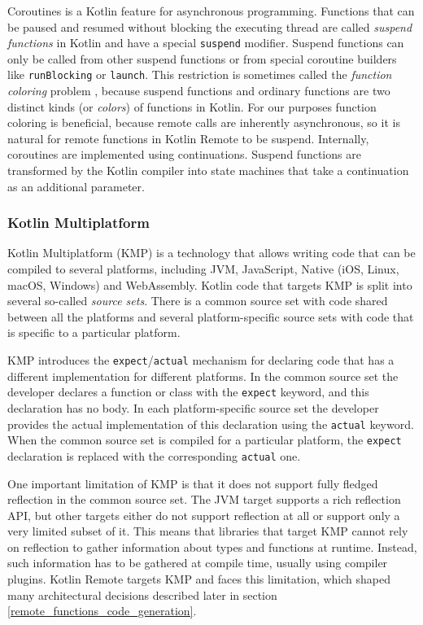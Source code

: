 \documentclass[a4paper,11pt,oneside]{article}
\newcommand{\term}[1]{\textit{#1}}
\newcommand{\kotlini}[1]{\texttt{#1}}
\begin{document}
Coroutines \cite{noauthor_kotlin_coroutines_nodate} is a Kotlin feature for asynchronous
programming. Functions that can be paused and resumed without blocking the executing thread are
called \term{suspend functions} in Kotlin and have a special \kotlini{suspend} modifier. Suspend
functions can only be called from other suspend functions or from special coroutine builders like
\kotlini{runBlocking} or \kotlini{launch}. This restriction is sometimes called the \term{function
coloring} problem \cite{noauthor_what_nodate}\cite{noauthor_keepnotescode-coloringmd_nodate},
because suspend functions and ordinary functions are two distinct kinds (or
\term{colors}) of functions in Kotlin. For our purposes function coloring is beneficial,
because remote calls are inherently asynchronous, so it is natural for remote functions in Kotlin
Remote to be suspend. Internally, coroutines are implemented using continuations. Suspend functions are transformed by the
Kotlin compiler into state machines that take a continuation as an additional parameter.

\subsubsection{Kotlin Multiplatform} \label{kotlin-multiplatform-section}

Kotlin Multiplatform (KMP) \cite{noauthor_kotlin_multiplatform_nodate} is a technology that allows
writing code that can be compiled to several platforms, including JVM, JavaScript, Native (iOS,
Linux, macOS, Windows) and WebAssembly. Kotlin code that targets KMP is split into several
so-called \term{source sets}. There is a common source set with code shared between all the
platforms and several platform-specific source sets with code that is specific to a particular
platform.

KMP introduces the \kotlini{expect}/\kotlini{actual} mechanism for declaring code that has a different
implementation for different platforms. In the common source set the developer declares a function or class
with the \kotlini{expect} keyword, and this declaration has no body. In each platform-specific source set
the developer provides the actual implementation of this declaration using the \kotlini{actual} keyword. When
the common source set is compiled for a particular platform, the \kotlini{expect} declaration is replaced
with the corresponding \kotlini{actual} one.

One important limitation of KMP is that it does not support fully fledged reflection in the common
source set. The JVM target supports a rich reflection API, but other targets either do not support
reflection at all or support only a very limited subset of it. This means that libraries that target
KMP cannot rely on reflection to gather information about types and functions at runtime. Instead,
such information has to be gathered at compile time, usually using compiler plugins. Kotlin Remote
targets KMP and faces this limitation, which shaped many architectural decisions described
later in section \ref{remote_functions_code_generation}.
\end{document}
